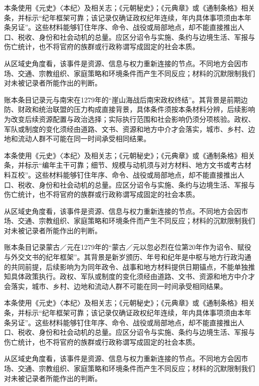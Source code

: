本条使用《元史》〈本纪〉及相关志；《元朝秘史》；《元典章》或《通制条格》相关条，并标示“纪年框架可靠；该记录仅确证政权纪年连续，年内具体事项须由本年条另证”。这些材料能够钉住年序、命令、战役或局部地点，却不能直接推出人口、税收、身份和社会动机的总量。应区分诏令与实施、条约与边境生活、军报与伤亡统计，也不将官府的族群或行政称谓写成固定的社会本质。

从区域史角度看，该事件是资源、信息与权力重新连接的节点。不同地方会因市场、交通、宗教组织、家庭策略和环境条件而产生不同反应；材料的沉默限制我们对未被记录者所能作出的判断。

账本条目记录元与南宋在1279年的“崖山海战后南宋政权终结”。其背景是前期边防、财政和统治联盟的压力构成直接背景，具体条件须按本条材料分辨，后续影响为改变后续资源配置与政治选择；实际执行范围和社会影响仍须分项核验。政权、军队或制度的变化须经由道路、文书、资源和地方中介才会落实，城市、乡村、边地和流动人群不可能在同一时间承受相同结果。

本条使用《元史》〈本纪〉及相关志；《元朝秘史》；《元典章》或《通制条格》相关条，并标示“编年主干可靠；细节、规模与动机须与对方材料、地方文书或考古材料互校”。这些材料能够钉住年序、命令、战役或局部地点，却不能直接推出人口、税收、身份和社会动机的总量。应区分诏令与实施、条约与边境生活、军报与伤亡统计，也不将官府的族群或行政称谓写成固定的社会本质。

从区域史角度看，该事件是资源、信息与权力重新连接的节点。不同地方会因市场、交通、宗教组织、家庭策略和环境条件而产生不同反应；材料的沉默限制我们对未被记录者所能作出的判断。

账本条目记录蒙古／元在1279年的“蒙古／元以忽必烈在位第20年作为诏令、赋役与外交文书的纪年框架”。其背景是新岁颁历、年号和纪年是中枢与地方行政沟通的共同前提，后续影响为为同年政令、战事和地方材料提供日期锚点，不能单独推知具体政策执行。政权、军队或制度的变化须经由道路、文书、资源和地方中介才会落实，城市、乡村、边地和流动人群不可能在同一时间承受相同结果。

本条使用《元史》〈本纪〉及相关志；《元朝秘史》；《元典章》或《通制条格》相关条，并标示“纪年框架可靠；该记录仅确证政权纪年连续，年内具体事项须由本年条另证”。这些材料能够钉住年序、命令、战役或局部地点，却不能直接推出人口、税收、身份和社会动机的总量。应区分诏令与实施、条约与边境生活、军报与伤亡统计，也不将官府的族群或行政称谓写成固定的社会本质。

从区域史角度看，该事件是资源、信息与权力重新连接的节点。不同地方会因市场、交通、宗教组织、家庭策略和环境条件而产生不同反应；材料的沉默限制我们对未被记录者所能作出的判断。

